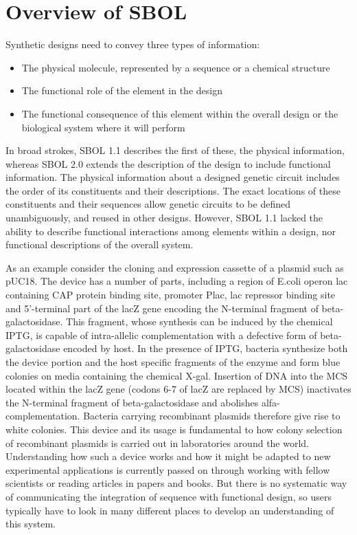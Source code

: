 \section{Overview of SBOL}
Synthetic designs need to convey three types of information:
\begin{itemize}
\item The physical molecule, represented by a sequence or a chemical structure
\item The functional role of the element in the design
\item The functional consequence of this element within the overall design or the biological system where it will perform 
\end{itemize}
In broad strokes, SBOL 1.1 describes the first of these, the physical information, whereas SBOL 2.0 extends the description of the design to include functional information. The physical information about a designed genetic circuit includes the order of its constituents and their descriptions. The exact locations of these constituents and their sequences allow genetic circuits to be defined unambiguously, and reused in other designs. However, SBOL 1.1 lacked the ability to describe functional interactions among elements within a design, nor functional descriptions of the overall system.


As an example consider the cloning and expression cassette of a plasmid such as pUC18. The device has a number of parts, including a region of E.coli operon lac containing CAP protein binding site, promoter Plac, lac repressor binding site and 5’-terminal part of the lacZ gene encoding the N-terminal fragment of beta-galactosidase. This fragment, whose synthesis can be induced by the chemical IPTG, is capable of intra-allelic complementation with a defective form of beta-galactosidase encoded by host. In the presence of IPTG, bacteria synthesize both the device portion and the host specific fragments of the enzyme and form blue colonies on media containing the chemical X-gal. Insertion of DNA into the MCS located within the lacZ gene (codons 6-7 of lacZ are replaced by MCS) inactivates the N-terminal fragment of beta-galactosidase and abolishes alfa-complementation. Bacteria carrying recombinant plasmids therefore give rise to white colonies. This device and its usage is fundamental to how colony selection of recombinant plasmids is carried out in laboratories around the world. Understanding how such a device works and how it might be adapted to new experimental applications is currently passed on through working with fellow scientists or reading articles in papers and books. But there is no systematic way of communicating the integration of sequence with functional design, so users typically have to look in many different places to develop an understanding of this system. 

